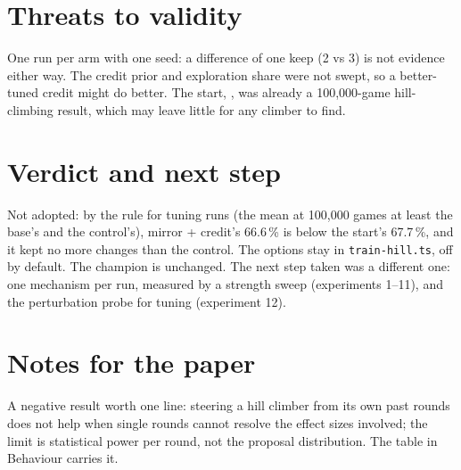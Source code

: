 \documentclass{../polyexp}
\begin{document}
\section{Threats to validity}
One run per arm with one seed: a difference of one keep (2 vs 3) is not evidence either way. The credit prior and exploration share were not swept, so a better-tuned credit might do better. The start, , was already a 100,000-game hill-climbing result, which may leave little for any climber to find.

\section{Verdict and next step}
Not adopted: by the rule for tuning runs (the mean at 100,000 games at least the base's and the control's), mirror + credit's 66.6\,\% is below the start's 67.7\,\%, and it kept no more changes than the control. The options stay in \texttt{train-hill.ts}, off by default. The champion is unchanged. The next step taken was a different one: one mechanism per run, measured by a strength sweep (experiments 1--11), and the perturbation probe for tuning (experiment 12).

\section{Notes for the paper}
A negative result worth one line: steering a hill climber from its own past rounds does not help when single rounds cannot resolve the effect sizes involved; the limit is statistical power per round, not the proposal distribution. The table in Behaviour carries it.
\end{document}
